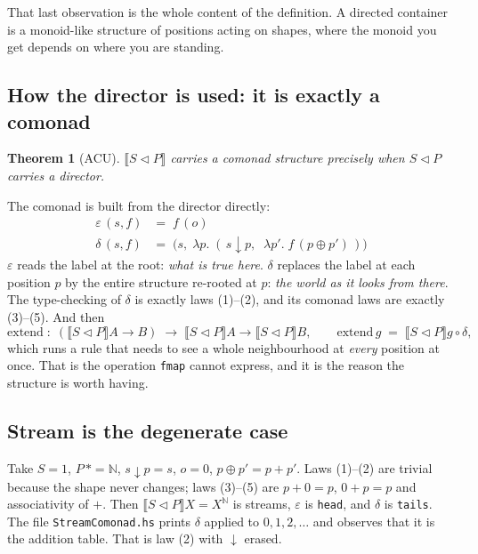 \documentclass[11pt,a4paper]{article}
\theoremstyle{definition}
\theoremstyle{plain}
\newtheorem{theorem}[definition]{Theorem}
\theoremstyle{remark}
\newcommand{\dc}{\ensuremath{S \triangleleft P}}
\newcommand{\den}[1]{\ensuremath{\llbracket #1 \rrbracket}}
\begin{document}
That last observation is the whole content of the definition. A directed
container is a monoid-like structure of positions acting on shapes, where the
monoid you get depends on where you are standing.

\subsection{How the director is used: it is exactly a comonad}

\begin{theorem}[ACU]
$\den{\dc}$ carries a comonad structure precisely when \dc{} carries a director.
\end{theorem}

The comonad is built from the director directly:
\[
\begin{array}{ll}
  \varepsilon\,(s, f) &=\; f\,(o) \\[3pt]
  \delta\,(s, f) &=\; \bigl(s,\;\lambda p.\;
      (\,s \downarrow p,\;\; \lambda p'.\; f\,(p \oplus p')\,)\bigr)
\end{array}
\]
$\varepsilon$ reads the label at the root: \emph{what is true here}.
$\delta$ replaces the label at each position $p$ by the entire structure
re-rooted at $p$: \emph{the world as it looks from there}. The type-checking of
$\delta$ is exactly laws (1)--(2), and its comonad laws are exactly (3)--(5).
And then
\[
  \mathrm{extend}\; :\; (\den{\dc}A \to B) \;\to\; \den{\dc}A \to \den{\dc}B,
  \qquad \mathrm{extend}\,g \;=\; \den{\dc}g \circ \delta,
\]
which runs a rule that needs to see a whole neighbourhood at \emph{every}
position at once. That is the operation \texttt{fmap} cannot express, and it is
the reason the structure is worth having.

\subsection{Stream is the degenerate case}

Take $S = 1$, $P\,\ast = \mathbb{N}$, $s \downarrow p = s$, $o = 0$,
$p \oplus p' = p + p'$. Laws (1)--(2) are trivial because the shape never
changes; laws (3)--(5) are $p+0=p$, $0+p=p$ and associativity of $+$. Then
$\den{\dc}X = X^{\mathbb{N}}$ is streams, $\varepsilon$ is \texttt{head}, and
$\delta$ is \texttt{tails}. The file \texttt{StreamComonad.hs} prints $\delta$
applied to $0,1,2,\dots$ and observes that it is the addition table. That is
law (2) with $\downarrow$ erased.
\end{document}
